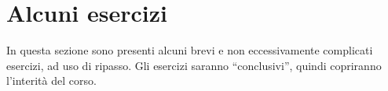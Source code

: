 \documentclass[a4paper,twoside]{book}
\begin{document}
	
	\mainmatter
	
	
	\section{Alcuni esercizi}
	In questa sezione sono presenti alcuni brevi e non eccessivamente complicati esercizi, ad uso di ripasso. Gli esercizi saranno \enquote{conclusivi}, quindi copriranno l'interità del corso.
	
	
	\appendix
	
	
	
	
	\printbibliography
	
	
	
\end{document}
